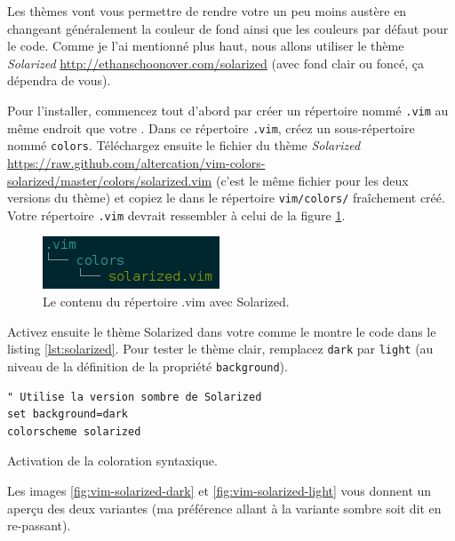 Les thèmes vont vous permettre de rendre votre \vim un peu moins austère en changeant généralement la couleur de fond ainsi que les couleurs par défaut pour le code. Comme je l'ai mentionné plus haut, nous allons utiliser le thème \emph{Solarized} \url{http://ethanschoonover.com/solarized} (avec fond clair ou foncé, ça dépendra de vous).

Pour l'installer, commencez tout d'abord par créer un répertoire nommé \Verb|.vim| au même endroit que votre \vimrc{}. Dans ce répertoire \Verb|.vim|, créez un sous-répertoire nommé \Verb|colors|. Téléchargez ensuite le fichier du thème \emph{Solarized} \url{https://raw.github.com/altercation/vim-colors-solarized/master/colors/solarized.vim} (c'est le même fichier pour les deux versions du thème) et copiez le dans le répertoire \Verb|vim/colors/| fraîchement créé. Votre répertoire \Verb|.vim| devrait ressembler à celui de la figure \ref{fig:solarized-tree}.

\begin{figure}%
  \center
  \includegraphics[width=0.3\linewidth]{graphics/solarized-tree.png}
  \caption{Le contenu du répertoire .vim avec Solarized.}
  \label{fig:solarized-tree}
\end{figure}

Activez ensuite le thème Solarized dans votre \vimrc comme le montre le code dans le listing \ref{lst:solarized}. Pour tester le thème clair, remplacez \Verb|dark| par \Verb|light| (au niveau de la définition de la propriété \Verb|background|).

\begin{listing}[H]
\begin{verbatim}
" Utilise la version sombre de Solarized
set background=dark
colorscheme solarized
\end{verbatim}
  \caption{Activation de la coloration syntaxique.}
  \label{lst:solarized}
\end{listing}

Les images \ref{fig:vim-solarized-dark} et \ref{fig:vim-solarized-light} vous donnent un aperçu des deux variantes (ma préférence allant à la variante sombre soit dit en re-passant).

